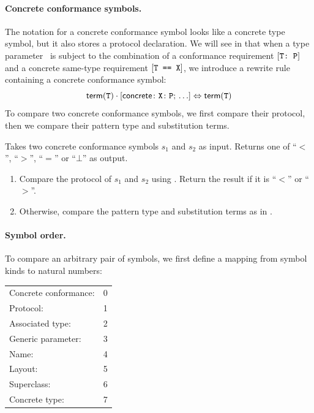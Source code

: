 \documentclass[../generics]{subfiles}
\begin{document}
\paragraph{Concrete conformance symbols.} The notation for a concrete conformance symbol looks like a concrete type symbol, but it also stores a protocol declaration. We will see in  that when a type parameter \tT\ is subject to the combination of a conformance requirement $[\texttt{T:~P}]$ and a concrete same-type requirement $[\texttt{T == X}]$, we introduce a rewrite rule containing a concrete conformance symbol:
\[\mathsf{term}(\texttt{T})\cdot[\mathsf{concrete}\colon \texttt{X}\colon\texttt{P};\,\ldots] \Leftrightarrow \mathsf{term}(\texttt{T})\]
To compare two concrete conformance symbols, we first compare their protocol, then we compare their pattern type and substitution terms.
\begin{algorithm}\label{concrete conformance reduction order}
Takes two concrete conformance symbols $s_1$ and $s_2$ as input. Returns one of ``$<$'', ``$>$'', ``$=$'' or \index{$\bot$}``$\bot$'' as output.
\begin{enumerate}
\item Compare the protocol of $s_1$ and $s_2$ using . Return the result if it is ``$<$'' or ``$>$''.
\item Otherwise, compare the pattern type and substitution terms as in .
\end{enumerate}
\end{algorithm}

\paragraph{Symbol order.} To compare an arbitrary pair of symbols, we first define a mapping from symbol kinds to natural numbers:
\begin{center}
\begin{tabular}{ll}
\toprule
Concrete conformance:&0\\
Protocol:&1\\
Associated type:&2\\
Generic parameter:&3\\
Name:&4\\
Layout:&5\\
Superclass:&6\\
Concrete type:&7\\
\bottomrule
\end{tabular}
\end{center}
\end{document}
